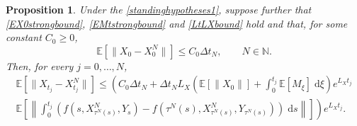 \documentclass[reqno,12pt]{amsart}
\theoremstyle{plain} %
\newtheorem{proposition}{Proposition}[section]
\theoremstyle{definition} %
\begin{document}
\begin{proposition}
    \label{propbasicestimate}
    Under the \cref{standinghypotheses1}, suppose further that \eqref{EX0strongbound}, \eqref{EMtstrongbound} and \eqref{LtLXbound} hold and that, for some constant $C_0 \geq 0$, 
    \begin{equation}
        \label{EX0X0N}
        \mathbb{E}[\|X_0 - X_0^N\|] \leq C_0 \Delta t_N, \qquad N\in \mathbb{N}.
    \end{equation}
    Then, for every $j = 0, \ldots, N$,
    \begin{multline}
        \label{expectedestimateglobalerrorintegral}
            \mathbb{E} \left[\|X_{t_j} - X_{t_j}^N\|\right] \leq \left( C_0 \Delta t_N + \Delta t_N L_X \left(\mathbb{E}[\|X_0\|] + \int_0^{t_j} \mathbb{E}[M_\xi]\;\mathrm{d}\xi\right)e^{L_X t_j}\right. \\
            \left. \mathbb{E}\left[\left\|\int_0^{t_j} \left( f(s, X_{\tau^N(s)}^N, Y_s) - f(\tau^N(s), X_{\tau^N(s)}^N, Y_{\tau^N(s)}) \right)\;\mathrm{d}s\right\|\right]\right) e^{L_X t_j}.
    \end{multline}
\end{proposition}
\end{document}
